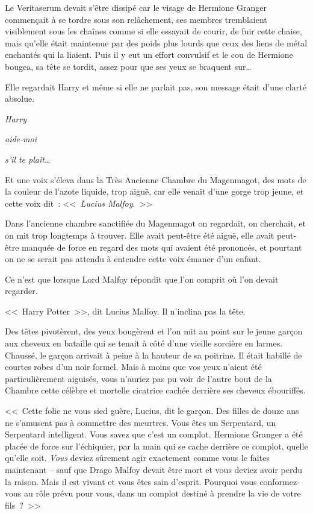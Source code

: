 Le Veritaserum devait s'être dissipé car le visage de Hermione Granger commençait à se tordre sous son relâchement, ses membres tremblaient visiblement sous les chaînes comme si elle essayait de courir, de fuir cette chaise, mais qu'elle était maintenue par des poids plus lourds que ceux des liens de métal enchantés qui la liaient. Puis il y eut un effort convulsif et le cou de Hermione bougea, sa tête se tordit, assez pour que ses yeux se braquent sur…

Elle regardait Harry et même si elle ne parlait pas, son message était d'une clarté absolue.

\emph{Harry}

\emph{aide-moi}

\emph{s'il te plaît…}

Et une voix s'éleva dans la Très Ancienne Chambre du Magenmagot, des mots de la couleur de l'azote liquide, trop aiguë, car elle venait d'une gorge trop jeune, et cette voix dit~: <<~\emph{Lucius Malfoy}.~>>

\later

Dans l'ancienne chambre sanctifiée du Magenmagot on regardait, on cherchait, et on mit trop longtemps à trouver. Elle avait peut-être été aiguë, elle avait peut-être manquée de force en regard des mots qui avaient été prononcés, et pourtant on ne se serait pas attendu à entendre cette voix émaner d'un enfant.

Ce n'est que lorsque Lord Malfoy répondit que l'on comprit où l'on devait regarder.

<<~Harry Potter~>>, dit Lucius Malfoy. Il n'inclina pas la tête.

Des têtes pivotèrent, des yeux bougèrent et l'on mit au point sur le jeune garçon aux cheveux en bataille qui se tenait à côté d'une vieille sorcière en larmes. Chaussé, le garçon arrivait à peine à la hauteur de sa poitrine. Il était habillé de courtes robes d'un noir formel. Mais à moins que vos yeux n'aient été particulièrement aiguisés, vous n'auriez pas pu voir de l'autre bout de la Chambre cette célèbre et mortelle cicatrice cachée derrière ses cheveux ébouriffés.

<<~Cette folie ne vous sied guère, Lucius, dit le garçon. Des filles de douze ans ne s'amusent pas à commettre des meurtres. Vous êtes un Serpentard, un Serpentard intelligent. Vous savez que c'est un complot. Hermione Granger a été placée de force sur l'échiquier, par la main qui se cache derrière ce complot, quelle qu'elle soit. \emph{Vous} deviez sûrement agir exactement comme vous le faites maintenant -- sauf que Drago Malfoy devait être mort et vous deviez avoir perdu la raison. Mais il est vivant et vous êtes sain d'esprit. Pourquoi vous conformez-vous au rôle prévu pour vous, dans un complot destiné à prendre la vie de votre fils~?~>>

